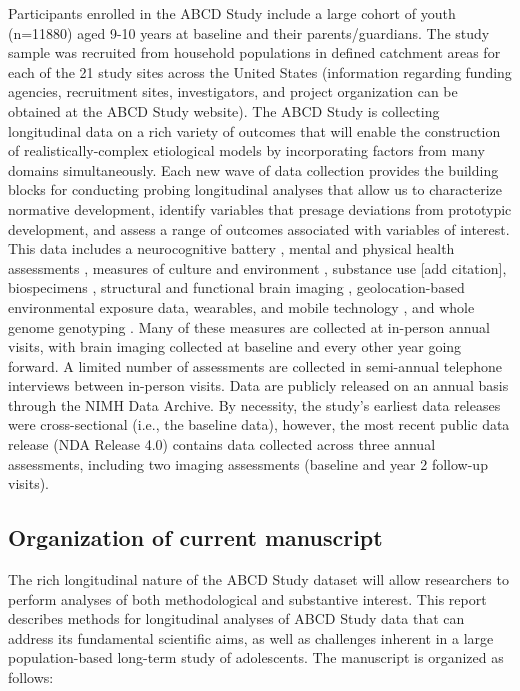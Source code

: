 \documentclass[
  10pt,
  letterpaper,
]{article}
\begin{document}
Participants enrolled in the ABCD Study include a large cohort of youth
(n=11880) aged 9-10 years at baseline and their parents/guardians. The
study sample was recruited from household populations in defined
catchment areas for each of the 21 study sites across the United States
(information regarding funding agencies, recruitment sites,
investigators, and project organization can be obtained at the ABCD
Study website). The ABCD Study is collecting longitudinal data on a rich
variety of outcomes that will enable the construction of
realistically-complex etiological models by incorporating factors from
many domains simultaneously. Each new wave of data collection provides
the building blocks for conducting probing longitudinal analyses that
allow us to characterize normative development, identify variables that
presage deviations from prototypic development, and assess a range of
outcomes associated with variables of interest. This data includes a
neurocognitive battery \citep{luciana2018a, thompson2019}, mental and
physical health assessments \citep{barch2018}, measures of culture and
environment \citep{zucker2018}, substance use {[}add citation{]},
biospecimens \citep{uban2018}, structural and functional brain imaging
\citep{casey2018, hagler2019}, geolocation-based environmental exposure
data, wearables, and mobile technology \citep{bagot2018}, and whole
genome genotyping \citep{loughnan2020}. Many of these measures are
collected at in-person annual visits, with brain imaging collected at
baseline and every other year going forward. A limited number of
assessments are collected in semi-annual telephone interviews between
in-person visits. Data are publicly released on an annual basis through
the NIMH Data Archive. By necessity, the study's earliest data releases
were cross-sectional (i.e., the baseline data), however, the most recent
public data release (NDA Release 4.0) contains data collected across
three annual assessments, including two imaging assessments (baseline
and year 2 follow-up visits).

\hypertarget{organization-of-current-manuscript}{%
\subsection{Organization of current
manuscript}\label{organization-of-current-manuscript}}

The rich longitudinal nature of the ABCD Study dataset will allow
researchers to perform analyses of both methodological and substantive
interest. This report describes methods for longitudinal analyses of
ABCD Study data that can address its fundamental scientific aims, as
well as challenges inherent in a large population-based long-term study
of adolescents. The manuscript is organized as follows:
\end{document}
